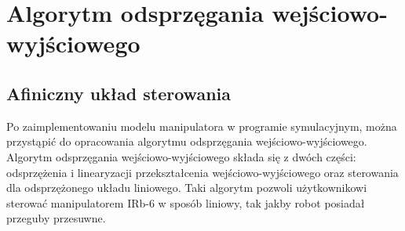 \documentclass[eng,printmode]{mgr}
\begin{document}
\chapter{Algorytm odsprzęgania wejściowo-wyjściowego}
\section{Afiniczny układ sterowania}
Po zaimplementowaniu modelu manipulatora w programie symulacyjnym, można przystąpić do opracowania algorytmu odsprzęgania wejściowo-wyjściowego. Algorytm odsprzęgania wejściowo-wyjściowego składa się z dwóch części: odsprzężenia i linearyzacji przekształcenia wejściowo-wyjściowego oraz sterowania dla odsprzężonego układu liniowego. Taki algorytm pozwoli użytkownikowi sterować manipulatorem IRb-6 w sposób liniowy, tak jakby robot posiadał przeguby przesuwne.
\end{document}
